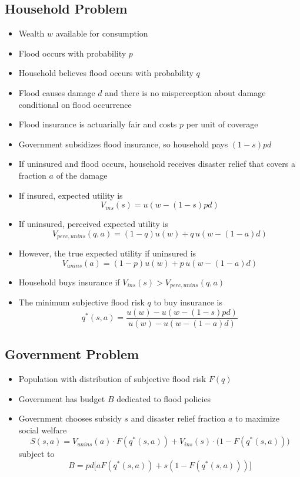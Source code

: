\documentclass[12pt]{article}
\begin{document}
\subsection{Household Problem}

\begin{itemize}
    \item Wealth $w$ available for consumption
    \item Flood occurs with probability $p$
    \item Household believes flood occurs with probability $q$ 
    \item Flood causes damage $d$ and there is no misperception about damage conditional on flood occurrence
    \item Flood insurance is actuarially fair and costs $p$ per unit of coverage
    \item Government subsidizes flood insurance, so household pays $(1-s)p d$
    \item If uninsured and flood occurs, household receives disaster relief that covers a fraction $a$ of the damage
    \item If insured, expected utility is
    \[
    V_{ins}(s) = u(w - (1-s)p d)
    \]
    \item If uninsured, perceived expected utility is
    \[
    V_{perc,unins}(q,a) = (1-q)u(w) + q \, u(w - (1-a)d)
    \]
    \item However, the true expected utility if uninsured is
    \[
    V_{unins}(a) = (1-p)u(w) + p \, u(w - (1-a)d)
    \]
    \item Household buys insurance if $V_{ins}(s) > V_{perc,unins}(q,a)$
    \item The minimum subjective flood risk $q$ to buy insurance is
    \[
    q^*(s,a) = \frac{u(w) - u(w - (1-s)p d)}{u(w) - u(w - (1-a)d)}
    \]
\end{itemize}

\subsection{Government Problem}

\begin{itemize}
    \item Population with distribution of subjective flood risk $F(q)$
    \item Government has budget $B$ dedicated to flood policies
    \item Government chooses subsidy $s$ and disaster relief fraction $a$ to maximize social welfare
    \[
    S(s,a) = V_{unins}(a) \cdot F(q^*(s,a)) + V_{ins}(s) \cdot \bigl(1 - F(q^*(s,a))\bigr)
    \]
    subject to
    \[
    B = pd \bigl[ a F(q^*(s,a)) + s (1 - F(q^*(s,a))) \bigr]
    \]
\end{itemize}
\end{document}
